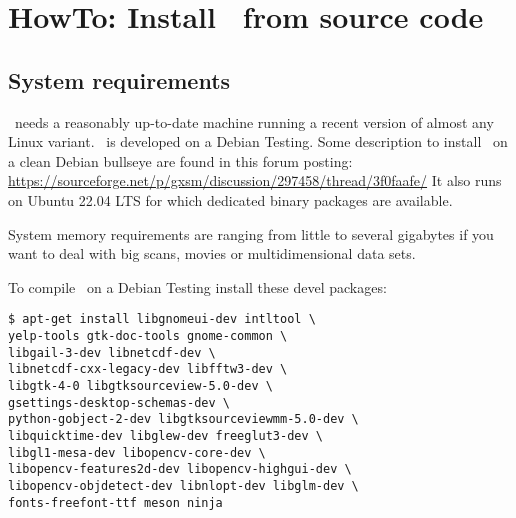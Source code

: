 
\chapter{HowTo: Install \Gxsm\ from source code}

\section{System requirements}
\Gxsm\ needs a reasonably up-to-date machine running a recent version of almost any Linux variant. \Gxsm\ is developed on a Debian Testing. Some description to install \Gxsm\ on a clean Debian bullseye are found in this forum posting: \url{https://sourceforge.net/p/gxsm/discussion/297458/thread/3f0faafe/} It also runs on Ubuntu 22.04 LTS for which dedicated binary packages are available. 

System memory requirements are ranging from little to several gigabytes if you want to deal with big scans, movies or multidimensional data sets.

To compile \Gxsm\ on a Debian Testing install these devel packages:

\begin{verbatim}
$ apt-get install libgnomeui-dev intltool \
yelp-tools gtk-doc-tools gnome-common \ 
libgail-3-dev libnetcdf-dev \
libnetcdf-cxx-legacy-dev libfftw3-dev \
libgtk-4-0 libgtksourceview-5.0-dev \
gsettings-desktop-schemas-dev \ 
python-gobject-2-dev libgtksourceviewmm-5.0-dev \
libquicktime-dev libglew-dev freeglut3-dev \ 
libgl1-mesa-dev libopencv-core-dev \ 
libopencv-features2d-dev libopencv-highgui-dev \
libopencv-objdetect-dev libnlopt-dev libglm-dev \
fonts-freefont-ttf meson ninja
\end{verbatim}

